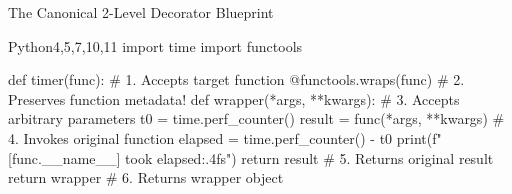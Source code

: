\begin{frame}[fragile]{The Canonical 2-Level Decorator Blueprint}
  \begin{HighlightedCodeBlock}{Python}{4,5,7,10,11}
import time
import functools

def timer(func):                       # 1. Accepts target function
    @functools.wraps(func)             # 2. Preserves function metadata!
    def wrapper(*args, **kwargs):      # 3. Accepts arbitrary parameters
        t0 = time.perf_counter()
        result = func(*args, **kwargs) # 4. Invokes original function
        elapsed = time.perf_counter() - t0
        print(f"[{func.__name__}] took {elapsed:.4f}s")
        return result                  # 5. Returns original result
    return wrapper                     # 6. Returns wrapper object
  \end{HighlightedCodeBlock}
  \vfill
\end{frame}

